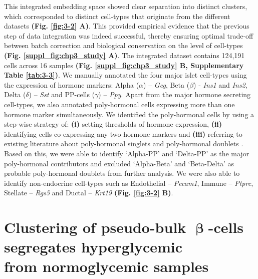 This integrated embedding space showed clear separation into distinct clusters, which corresponded to distinct cell-types that originate from the different datasets \textbf{(Fig. \ref{fig:3-2} A)}. This provided empirical evidence that the previous step of data integration was indeed successful, thereby ensuring optimal trade-off between batch correction and biological conservation on the level of cell-types \textbf{(Fig. \ref{suppl_fig:chp3_study} A)}. The integrated dataset contains 124,191 cells across 16 samples \textbf{(Fig. \ref{suppl_fig:chp3_study} B, Supplementary Table \ref{tab:3-3})}. We manually annotated the four major islet cell-types using the expression of hormone markers: Alpha ($\alpha$) – \textit{Gcg}, Beta ($\beta$) - \textit{Ins1} and \textit{Ins2}, Delta ($\delta$) – \textit{Sst} and PP-cells ($\gamma$) – \textit{Ppy}. Apart from the major hormone secreting cell-types, we also annotated poly-hormonal cells expressing more than one hormone marker simultaneously. We identified the poly-hormonal cells by using a step-wise strategy of: \textbf{(i)} setting thresholds of hormone expression, \textbf{(ii)} identifying cells co-expressing any two hormone markers and \textbf{(iii)} referring to existing literature about poly-hormonal singlets and poly-hormonal doublets \textbf{\cite{sachs_targeted_2020, perez-frances_pancreatic_2021}}. Based on this, we were able to identify `Alpha-PP’ and `Delta-PP’ as the major poly-hormonal contributors and excluded `Alpha-Beta' and `Beta-Delta' as probable poly-hormonal doublets from further analysis. We were also able to identify non-endocrine cell-types such as Endothelial – \textit{Pecam1}, Immune – \textit{Ptprc}, Stellate – \textit{Rgs5} and Ductal – \textit{Krt19} \textbf{(Fig. \ref{fig:3-2} B)}.


\clearpage

\section{Clustering of pseudo-bulk \( \mathbf{\upbeta}\)-cells segregates hyperglycemic\\from normoglycemic samples}
\label{sec:chp3_pseudobulk}

